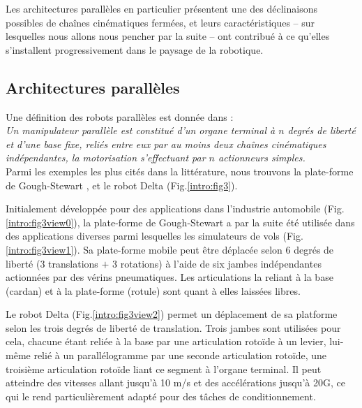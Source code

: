 Les architectures parallèles en particulier présentent une des déclinaisons 
possibles de chaînes cinématiques fermées, et leurs caractéristiques -- sur 
lesquel\-les nous allons nous pencher par la suite -- ont contribué à ce 
qu'elles s'installent progressivement dans le paysage de la robotique.

\subsection{Architectures parallèles} \label{chap0-0-2}

Une définition des robots parallèles est donnée dans \cite{merlet1997robots} :\\
{\it Un manipulateur parallèle est constitué d’un organe terminal à $n$ degrés de li\-berté et d’une base fixe, reliés entre eux par au moins deux chaînes
cinématiques indépendantes, la motorisation s’effectuant par $n$ actionneurs simples.}\\

Parmi les exemples les plus cités dans la littérature, nous trouvons 
la plate-forme de Gough-Stewart \cite{1956:Gough}, \cite{1965:Stewart} et le 
robot Delta \cite{1988:Clavel} (Fig.\ref{intro:fig3}).

Initialement développée pour des applications dans l'industrie automobile 
(Fig.\ref{intro:fig3view0}), la plate-forme de Gough-Stewart a par la suite été 
utilisée dans des applications diverses parmi lesquelles les simulateurs de vols 
(Fig.\ref{intro:fig3view1}). Sa plate-forme mobile peut être déplacée selon 6 
degrés de liberté (3 translations $+$ 3 rotations) à l'aide de six jambes 
indépendantes actionnées par des vérins pneumatiques. Les articulations la 
reliant à la base (cardan) et à la plate-forme (rotule) sont quant à elles 
laissées libres.

Le robot Delta (Fig.\ref{intro:fig3view2}) permet un déplacement de sa platforme 
selon les trois degrés de liberté de translation. Trois jambes sont utilisées 
pour cela, chacune étant reliée à la base par une articulation rotoïde à un 
levier, lui-même relié à un parallélogramme par une seconde articulation 
rotoïde, une troisième articulation rotoïde liant ce segment à l'organe 
terminal. Il peut atteindre des vitesses allant jusqu'à 10 m/s et des 
accélérations jusqu'à 20G, ce qui le rend particulièrement adapté pour des 
tâches de conditionnement. 

